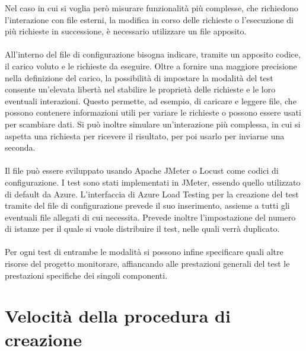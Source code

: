 Nel caso in cui si voglia però misurare funzionalità più complesse, 
che richiedono l'interazione con file esterni, la modifica in corso delle richieste o 
l'esecuzione di più richieste in successione, è necessario utilizzare un file apposito.\\
\\
All'interno del file di configurazione bisogna indicare, tramite un apposito codice,
il carico voluto e le richieste da eseguire.
Oltre a fornire una maggiore precisione nella definizione del carico, 
la possibilità di impostare la modalità del test
consente un'elevata libertà nel stabilire le proprietà delle richieste e le loro eventuali interazioni.
Questo permette, ad esempio, di caricare e leggere file, 
che possono contenere informazioni utili per variare le richieste o
possono essere usati per scambiare dati.
Si può inoltre simulare un'interazione più complessa,
in cui si aspetta una richiesta per ricevere il risultato, 
per poi usarlo per inviarne una seconda.\\
\\
Il file può essere sviluppato usando Apache JMeter o Locust come codici di configurazione.
I test sono stati implementati in JMeter,
essendo quello utilizzato di default da Azure.
L'interfaccia di Azure Load Testing per la creazione del test tramite del file di configurazione
prevede il suo inserimento, assieme a tutti gli eventuali file allegati di cui necessita.
Prevede inoltre l'impostazione del numero di istanze 
per il quale si vuole distribuire il test, nelle quali verrà duplicato.\\
\\
Per ogni test di entrambe le modalità si possono infine specificare quali altre risorse del progetto monitorare,
affiancando alle prestazioni generali del test le prestazioni specifiche dei singoli componenti.
\section{Velocità della procedura di creazione}

